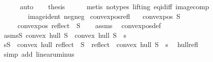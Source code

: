 \begin{isabellebody}
\ {}\ {}\ {}\ \isamarkupfalse%
\ auto\isanewline
\ \ \isamarkupfalse%
\ {\isacharquery}{\kern0pt}thesis\isanewline
\ \ \ \ \isamarkupfalse%
\ {\isacharparenleft}{\kern0pt}metis\ {\isacharparenleft}{\kern0pt}no{\isacharunderscore}{\kern0pt}types{\isacharcomma}{\kern0pt}\ lifting{\isacharparenright}{\kern0pt}\ eq{\isacharunderscore}{\kern0pt}id{\isacharunderscore}{\kern0pt}iff\ image{\isacharunderscore}{\kern0pt}comp\isanewline
\ \ \ \ \ \ \ \ image{\isacharunderscore}{\kern0pt}ident\ neg{\isacharunderscore}{\kern0pt}neg{\isacharparenright}{\kern0pt}\isanewline
{}\isamarkupfalse%
%
\endisatagproof
{\isafoldproof}%
%
\isadelimproof
\isanewline
%
\endisadelimproof
\isanewline
{}\isamarkupfalse%
\ convex{\isacharunderscore}{\kern0pt}pos{\isacharunderscore}{\kern0pt}refl{\isacharcolon}{\kern0pt}\isanewline
\ \ \ {\isachardoublequoteopen}convex{\isacharunderscore}{\kern0pt}pos\ S{\isachardoublequoteclose}\isanewline
\ \ \ \ \ {\isachardoublequoteopen}convex{\isacharunderscore}{\kern0pt}pos\ {\isacharparenleft}{\kern0pt}reflect\ {\isacharbackquote}{\kern0pt}\ S{\isacharparenright}{\kern0pt}{\isachardoublequoteclose}\isanewline
%
\isadelimproof
\ \ %
\endisadelimproof
%
\isatagproof
{}\isamarkupfalse%
\ assms\ \isamarkupfalse%
\ convex{\isacharunderscore}{\kern0pt}pos{\isacharunderscore}{\kern0pt}def\isanewline
{}\isamarkupfalse%
{\isacharminus}{\kern0pt}\isanewline
\ \ \isamarkupfalse%
\ asm{\isacharcolon}{\kern0pt}{\isachardoublequoteopen}{\isasymforall}s{\isasymin}S{\isachardot}{\kern0pt}\ convex\ hull\ S\ {\isasymnoteq}\ convex\ hull\ {\isacharparenleft}{\kern0pt}S\ {\isacharminus}{\kern0pt}\ {\isacharbraceleft}{\kern0pt}s{\isacharbraceright}{\kern0pt}{\isacharparenright}{\kern0pt}{\isachardoublequoteclose}\isanewline
\ \ \isamarkupfalse%
\ {}{\isacharcolon}{\kern0pt}{\isachardoublequoteopen}s{\isasymin}S\ {\isasymlongrightarrow}\ convex\ hull\ reflect\ {\isacharbackquote}{\kern0pt}\ S\ {\isacharequal}{\kern0pt}\ reflect\ {\isacharbackquote}{\kern0pt}\ {\isacharparenleft}{\kern0pt}convex\ hull\ S{\isacharparenright}{\kern0pt}{\isachardoublequoteclose}\ \ s\ \isamarkupfalse%
\ hull{\isacharunderscore}{\kern0pt}refl\isanewline
\ \ \ \ \isamarkupfalse%
\ {\isacharparenleft}{\kern0pt}simp\ add{\isacharcolon}{\kern0pt}\ linear{\isacharunderscore}{\kern0pt}uminus{\isacharparenright}{\kern0pt}\isanewline

\end{isabellebody}
